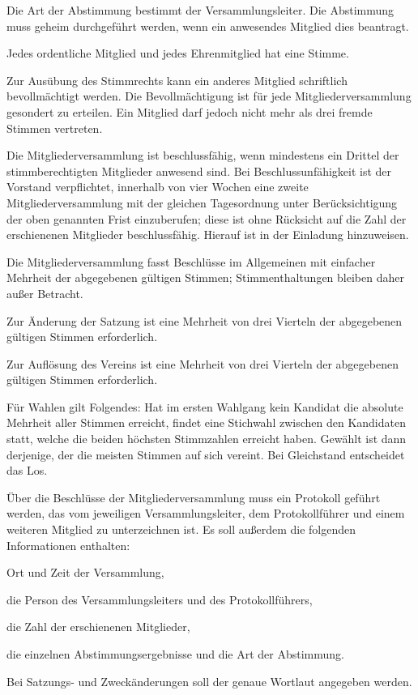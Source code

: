 \begin{contract}
\begin{para}
	\item Die Art der Abstimmung bestimmt der Versammlungsleiter. Die Abstimmung muss geheim durchgeführt werden, wenn ein anwesendes Mitglied dies beantragt.
	\item Jedes ordentliche Mitglied und jedes Ehrenmitglied hat eine Stimme.
	\item Zur Ausübung des Stimmrechts kann ein anderes Mitglied schriftlich bevoll\-mächtigt werden. Die Bevollmächtigung ist für jede Mitgliederversammlung gesondert zu erteilen. Ein Mitglied darf jedoch nicht mehr als drei fremde Stimmen vertreten.
	\item Die Mitgliederversammlung ist beschlussfähig, wenn mindestens ein Drittel der stimmberechtigten Mitglieder anwesend sind.
	Bei Beschlussunfähigkeit ist der Vorstand verpflichtet, innerhalb von vier Wochen eine zweite Mitglieder\-ver\-sammlung mit der gleichen Tagesordnung unter Berücksichtigung der oben genannten Frist einzuberufen; diese ist ohne Rücksicht auf die Zahl der erschienenen Mitglieder beschlussfähig. Hierauf ist in der Einladung hinzuweisen.
	\item Die Mitgliederversammlung fasst Beschlüsse im Allgemeinen mit einfacher Mehrheit der abgegebenen gültigen Stimmen; Stimmenthaltungen bleiben daher außer Betracht.
	\item Zur Änderung der Satzung ist eine Mehrheit von drei Vierteln der abgegebenen gültigen Stimmen erforderlich.
	\item Zur Auflösung des Vereins ist eine Mehrheit von drei Vierteln der abgegebenen gültigen Stimmen erforderlich.
	\item Für Wahlen gilt Folgendes: Hat im ersten Wahlgang kein Kandidat die absolute Mehrheit aller Stimmen erreicht, findet eine Stichwahl zwischen den Kandidaten statt, welche die beiden höchsten Stimmzahlen erreicht haben. Gewählt ist dann derjenige, der die meisten Stimmen auf sich vereint. Bei Gleichstand entscheidet das Los.
	\item Über die Beschlüsse der Mitgliederversammlung muss ein Protokoll geführt werden, das vom jeweiligen Versammlungsleiter, dem Protokollführer und einem weiteren Mitglied zu unterzeichnen ist.
	Es soll außerdem die folgenden Informationen enthalten:
	\begin{subpara}
		\item Ort und Zeit der Versammlung, 
		\item die Person des Versammlungsleiters und des Protokollführers, 
		\item die Zahl der erschienenen Mitglieder, 
		\item die einzelnen Abstimmungsergebnisse und die Art der Abstimmung. 
	\end{subpara}
	Bei Satzungs- und Zweckänderungen soll der genaue Wortlaut angegeben werden.


\end{para}
\end{contract}
